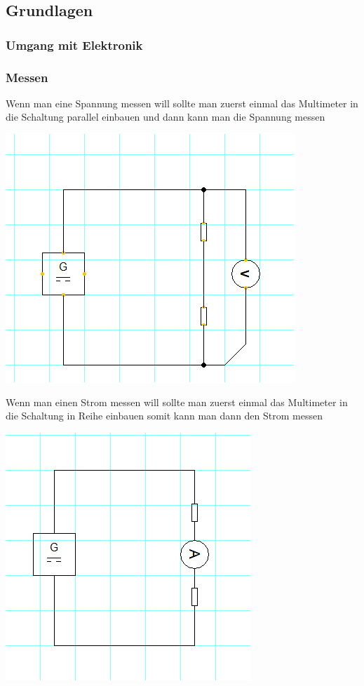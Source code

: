 \documentclass{report}
\begin{document}
\subsection{Grundlagen}

\subsubsection{Umgang mit Elektronik}

\subsubsection{Messen}

Wenn man eine Spannung messen will sollte man zuerst einmal das Multimeter in die Schaltung parallel einbauen und dann kann man die Spannung messen

\includegraphics[scale=0.75]{3.png}

Wenn man einen Strom messen will sollte man zuerst einmal das Multimeter in die Schaltung in Reihe einbauen somit kann man dann den Strom messen

\includegraphics[scale=0.75]{2.png}
\end{document}

